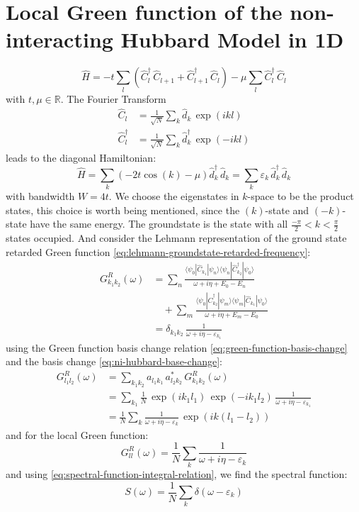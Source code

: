 \section{Local Green function of the non-interacting Hubbard Model in 1D}
\begin{equation*}
    \hat{H} = -t \sum_l \left( \hat{C}_l^{\dagger}\, \hat{C}_{l+1} + \hat{C}_{l+1}^{\dagger}\, \hat{C}_l \right) - \mu \sum_l \hat{C}_l^{\dagger}\, \hat{C}_l
\end{equation*}
with $t, \mu \in \mathbb{R}$. The Fourier Transform
\begin{align}
    \hat{C}_l &= \frac{1}{\sqrt{N}} \sum_k \hat{d}_k\, \exp(ikl) \label{eq:ni-hubbard-base-change} \\ 
    \hat{C}_l^{\dagger} &= \frac{1}{\sqrt{N}} \sum_k \hat{d}_k^{\dagger}\, \exp(-ikl)
\end{align}
leads to the diagonal Hamiltonian:
\begin{equation*}
    \hat{H} = \sum_k \left( -2t\cos(k) - \mu \right) \hat{d}_k^{\dagger}\, \hat{d}_k = \sum_k \varepsilon_k\, \hat{d}_k^{\dagger}\, \hat{d}_k
\end{equation*}
with bandwidth $W = 4t$.
We choose the eigenstates in $k$-space to be the product states, this choice is worth being mentioned, since the $(k)$-state and $(-k)$-state have the same energy.
The groundstate is the state with all $\frac{-\pi}{2}<k<\frac{\pi}{2}$ states occupied.
And consider the Lehmann representation of the ground state retarded Green function \eqref{eq:lehmann-groundstate-retarded-frequency}:
\begin{align*}
    G^{R}_{k_1 k_2}(\omega) &= \sum_n \frac{\langle \psi_0 | \hat{C}_{k_1} |\psi_n\rangle\langle\psi_n| \hat{C}_{k_2}^{\dagger} |\psi_0\rangle}{\omega + i\eta + E_0 - E_n} \\
    &\quad + \sum_m \frac{\langle \psi_0 | \hat{C}_{k_2}^{\dagger} |\psi_m\rangle\langle\psi_m| \hat{C}_{k_1} |\psi_0\rangle}{\omega + i\eta + E_m - E_0} \\
    &= \delta_{k_1 k_2}\, \frac{1}{\omega + i\eta - \varepsilon_{k_1}}
\end{align*}
using the Green function basis change relation \eqref{eq:green-function-basis-change} and the basis change \eqref{eq:ni-hubbard-base-change}:
\begin{align*}
    G^{R}_{l_1 l_2}(\omega) &= \sum_{k_1 k_2} a_{l_1 k_1}\, a_{l_2 k_2}^{*}\, G^{R}_{k_1 k_2}(\omega) \\
    &= \sum_{k_1} \frac{1}{N}\, \exp(i k_1 l_1)\, \exp(-i k_1 l_2)\, \frac{1}{\omega + i\eta - \varepsilon_{k_1}} \\
    &= \frac{1}{N} \sum_k \frac{1}{\omega + i\eta - \varepsilon_k}\, \exp(i k (l_1 - l_2))
\end{align*}
and for the local Green function:
\begin{equation*}
    G^{R}_{ll}(\omega) = \frac{1}{N} \sum_k \frac{1}{\omega + i\eta - \varepsilon_k}
\end{equation*}
and using \eqref{eq:spectral-function-integral-relation}, we find the spectral function:
\begin{equation*}
    S(\omega) = \frac{1}{N} \sum_k \delta(\omega - \varepsilon_k)
\end{equation*}

